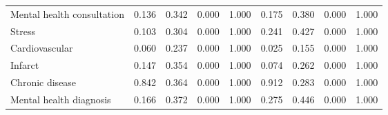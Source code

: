 \begin{tabular}{lcccccccc}
Mental health consultation &      0.136 &      0.342 &      0.000 &      1.000 &      0.175 &      0.380 &      0.000 &      1.000 \\ 
Stress &      0.103 &      0.304 &      0.000 &      1.000 &      0.241 &      0.427 &      0.000 &      1.000 \\ 
Cardiovascular &      0.060 &      0.237 &      0.000 &      1.000 &      0.025 &      0.155 &      0.000 &      1.000 \\ 
Infarct &      0.147 &      0.354 &      0.000 &      1.000 &      0.074 &      0.262 &      0.000 &      1.000 \\ 
Chronic disease &      0.842 &      0.364 &      0.000 &      1.000 &      0.912 &      0.283 &      0.000 &      1.000 \\ 
Mental health diagnosis &      0.166 &      0.372 &      0.000 &      1.000 &      0.275 &      0.446 &      0.000 &      1.000 \\ 
\bottomrule
\end{tabular}
